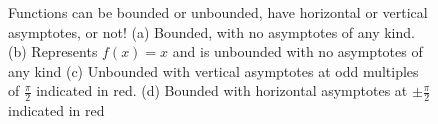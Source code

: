 \begin{figure}[htb]%
\centering
{}%
\hspace{5pt}%
%
\newline
\centering
{}%
\hspace{5pt}%
%
    \caption[]{Functions can be bounded or unbounded, have horizontal or vertical asymptotes, or not! (a) Bounded, with no asymptotes of any kind. (b) Represents $f(x) = x$ and is unbounded with no asymptotes of any kind (c) Unbounded with vertical asymptotes at odd multiples of $\frac{\pi}{2}$ indicated in red. (d) Bounded with horizontal asymptotes at $\pm \frac{\pi}{2}$ indicated in red}
    \label{fig:BoundedAndAsymptotes}
\end{figure}
\bigskip



